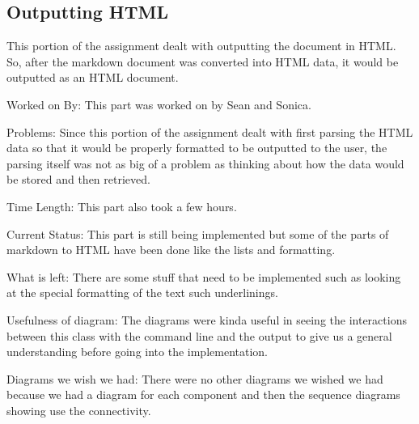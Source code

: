 \subsection{Outputting HTML}
This portion of the assignment dealt with outputting the document in HTML. So, after the markdown document was converted into HTML data, it would be outputted as an HTML document. \newline

\noindent Worked on By: This part was worked on by Sean and Sonica. \newline

\noindent Problems: Since this portion of the assignment dealt with first parsing the HTML data so that it would be properly formatted to be outputted to the user, the parsing itself was not as big of a problem as thinking about how the data would be stored and then retrieved. \newline

\noindent Time Length: This part also took a few hours. \newline

\noindent Current Status: This part is still being implemented but some of the parts of markdown to HTML have been done like the lists and formatting. \newline

\noindent What is left: There are some stuff that need to be implemented such as looking at the special formatting of the text such underlinings. \newline

\noindent Usefulness of diagram: The diagrams were kinda useful in seeing the interactions between this class with the command line and the output to give us a general understanding before going into the implementation. \newline

\noindent Diagrams we wish we had: There were no other diagrams we wished we had because we had a diagram for each component and then the sequence diagrams showing use the connectivity. 
